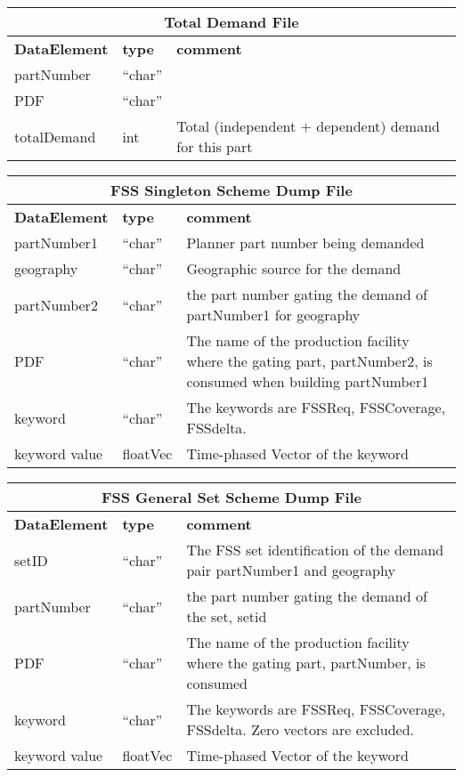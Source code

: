 \vspace{.5in}

\begin{tabular}{llp{4in}}
\multicolumn{3}{c}{{\bf Total Demand File}}\\ \hline\hline
{\bf DataElement} &  {\bf type}  &   {\bf comment} \\ \hline
partNumber &  ``char''     \\ 
PDF   & ``char''  \\
totalDemand & int & Total (independent $+$ dependent) demand for this part
\end{tabular}

\vspace{.5in}

\begin{tabular}{llp{4in}}
\multicolumn{3}{c}{{\bf FSS Singleton Scheme Dump File}}\\ \hline\hline
{\bf DataElement} &  {\bf type}  &   {\bf comment} \\ \hline
partNumber1 & ``char'' & Planner part number being demanded    \\ 
geography & ``char'' & Geographic source for the demand \\
partNumber2 & ``char'' & the part number gating the demand of partNumber1 for
 geography \\
PDF & ``char'' & The name of the production facility where the gating 
 part, partNumber2, is consumed when building partNumber1 \\
keyword & ``char''  & The keywords are FSSReq, FSSCoverage, FSSdelta. \\
keyword value  & floatVec &  Time-phased Vector of the keyword 
\end{tabular}

\vspace{.5in}

\begin{tabular}{llp{4in}}
\multicolumn{3}{c}{{\bf FSS General Set Scheme Dump File}}\\ \hline\hline
{\bf DataElement} &  {\bf type}  &   {\bf comment} \\ \hline
setID & ``char'' & The FSS set identification of the demand pair partNumber1 
  and geography\\
partNumber & ``char'' & the part number gating the demand of the set, setid \\
PDF & ``char'' & The name of the production facility where the gating 
 part, partNumber, is consumed  \\
keyword & ``char''  & The keywords are FSSReq, FSSCoverage, FSSdelta.
    Zero vectors are excluded.\\
keyword value  & floatVec &  Time-phased Vector of the keyword 
\end{tabular}


